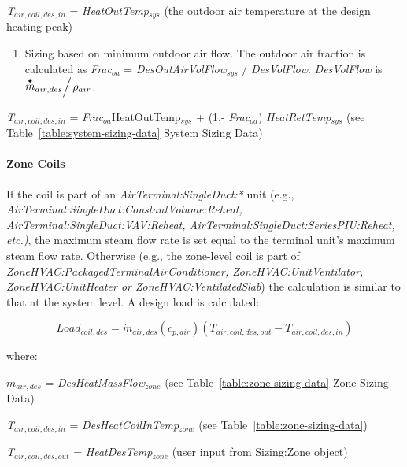 \emph{T\(_{air,coil,des,in}\)} = \emph{HeatOutTemp\(_{sys}\)} (the outdoor air temperature at the design heating peak)

\begin{enumerate}
\def\labelenumi{\arabic{enumi})}
\setcounter{enumi}{1}
\tightlist
\item
  Sizing based on minimum outdoor air flow. The outdoor air fraction is calculated as \emph{Frac}\(_{oa}\) = \emph{DesOutAirVolFlow\(_{sys}\)} / \emph{DesVolFlow}. \emph{DesVolFlow} is \({{{{\mathop m\limits^ \bullet }_{air,des}}} \mathord{\left/ {\vphantom {{{{\mathop m\limits^ \bullet }_{air,des}}} {{\rho_{air}}}}} \right. } {{\rho_{air}}}}\).
\end{enumerate}

\emph{T\(_{air,coil,des,in}\)} = \emph{Frac}\(_{oa}\)HeatOutTemp\(_{sys}\) + (1.- \emph{Frac\(_{oa}\)}) \emph{HeatRetTemp\(_{sys}\)} (see Table~\ref{table:system-sizing-data} System Sizing Data)

\paragraph{Zone Coils}\label{zone-coils-2}

If the coil is part of an \emph{AirTerminal:SingleDuct:*} unit (e.g., \emph{Air\-Terminal:\-Single\-Duct:\-Constant\-Volume\-:Re\-heat, Air\-Terminal:\-Single\-Duct:\-VAV:\-Re\-heat, Air\-Terminal:\-Single\-Duct:\-Series\-PIU:\-Re\-heat, etc.)}, the maximum steam flow rate is set equal to the terminal unit's maximum steam flow rate. Otherwise (e.g., the zone-level coil is part of \emph{Zone\-HVAC:\-Packaged\-Terminal\-Air\-Conditioner, Zone\-HVAC\-:Unit\-Ventilator, Zone\-HVAC\-:Unit\-Heater or Zone\-HVAC:\-Ventilated\-Slab}) the calculation is similar to that at the system level. A design load is calculated:

\begin{equation}
Loa{d_{coil,des}} = {\dot m_{air,des}}({c_{p,air}})({T_{air,coil,des,out}} - {T_{air,coil,des,in}})
\end{equation}

where:

\({\dot m_{air,des}}\) = \emph{DesHeatMassFlow\(_{zone}\)} (see Table~\ref{table:zone-sizing-data} Zone Sizing Data)

\emph{T\(_{air,coil,des,in}\)} = \emph{DesHeatCoilInTemp\(_{zone}\)} (see Table~\ref{table:zone-sizing-data})

\emph{T\(_{air,coil,des,out}\)} = \emph{HeatDesTemp\(_{zone}\)} (user input from Sizing:Zone object)


